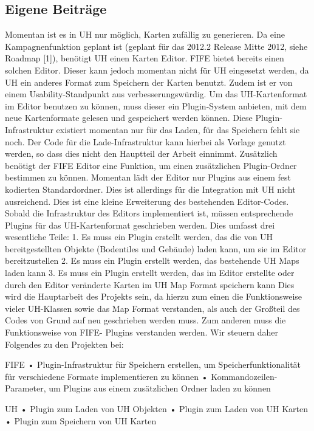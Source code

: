 
\subsection{Eigene Beiträge}
Momentan ist es in UH nur möglich, Karten zufällig zu generieren. Da eine
Kampagnenfunktion geplant ist (geplant für das 2012.2 Release Mitte 2012, siehe
Roadmap [1]), benötigt UH einen Karten Editor. FIFE bietet bereits einen solchen Editor.
Dieser kann jedoch momentan nicht für UH eingesetzt werden, da UH ein anderes Format
zum Speichern der Karten benutzt. Zudem ist er von einem Usability-Standpunkt aus
verbesserungswürdig.
Um das UH-Kartenformat im Editor benutzen zu können, muss dieser ein Plugin-System
anbieten, mit dem neue Kartenformate gelesen und gespeichert werden können. Diese
Plugin-Infrastruktur existiert momentan nur für das Laden, für das Speichern fehlt sie
noch. Der Code für die Lade-Infrastruktur kann hierbei als Vorlage genutzt werden, so
dass dies nicht den Hauptteil der Arbeit einnimmt.
Zusätzlich benötigt der FIFE Editor eine Funktion, um einen zusätzlichen Plugin-Ordner
bestimmen zu können. Momentan lädt der Editor nur Plugins aus einem fest kodierten
Standardordner. Dies ist allerdings für die Integration mit UH nicht ausreichend. Dies ist
eine kleine Erweiterung des bestehenden Editor-Codes.
Sobald die Infrastruktur des Editors implementiert ist, müssen entsprechende Plugins für
das UH-Kartenformat geschrieben werden. Dies umfasst drei wesentliche Teile:
1. Es muss ein Plugin erstellt werden, das die von UH bereitgestellten Objekte
(Bodentiles und Gebäude) laden kann, um sie im Editor bereitzustellen
2. Es muss ein Plugin erstellt werden, das bestehende UH Maps laden kann
3. Es muss ein Plugin erstellt werden, das im Editor erstellte oder durch den Editor
veränderte Karten im UH Map Format speichern kann
Dies wird die Hauptarbeit des Projekts sein, da hierzu zum einen die Funktionsweise vieler
UH-Klassen sowie das Map Format verstanden, als auch der Großteil des Codes von Grund
auf neu geschrieben werden muss. Zum anderen muss die Funktionsweise von FIFE-
Plugins verstanden werden.
Wir steuern daher Folgendes zu den Projekten bei:

FIFE
• Plugin-Infrastruktur für Speichern erstellen, um Speicherfunktionalität für
verschiedene Formate implementieren zu können
• Kommandozeilen-Parameter, um Plugins aus einem zusätzlichen Ordner laden zu
können

UH
• Plugin zum Laden von UH Objekten
• Plugin zum Laden von UH Karten
• Plugin zum Speichern von UH Karten



